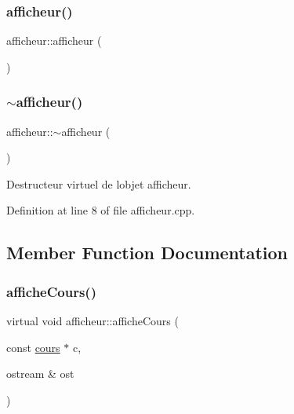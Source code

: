 \subsubsection{\texorpdfstring{afficheur()}{afficheur()}}
{\footnotesize\ttfamily afficheur\+::afficheur (\begin{DoxyParamCaption}{ }\end{DoxyParamCaption})\hspace{0.3cm}{\ttfamily [default]}}

\hypertarget{classafficheur_a093c44d15f6de24883abce836bfd11c9}{}\label{classafficheur_a093c44d15f6de24883abce836bfd11c9} 
\subsubsection{\texorpdfstring{$\sim$afficheur()}{~afficheur()}}
{\footnotesize\ttfamily afficheur\+::$\sim$afficheur (\begin{DoxyParamCaption}{ }\end{DoxyParamCaption})\hspace{0.3cm}{\ttfamily [virtual]}}



Destructeur virtuel de l\textquotesingle{}objet afficheur. 



Definition at line 8 of file afficheur.\+cpp.



\subsection{Member Function Documentation}
\hypertarget{classafficheur_a9d176576ad45c2a07a8a887b853b7edb}{}\label{classafficheur_a9d176576ad45c2a07a8a887b853b7edb} 
\subsubsection{\texorpdfstring{affiche\+Cours()}{afficheCours()}}
{\footnotesize\ttfamily virtual void afficheur\+::affiche\+Cours (\begin{DoxyParamCaption}\item[{const \hyperlink{classcours}{cours} $\ast$}]{c,  }\item[{ostream \&}]{ost }\end{DoxyParamCaption})\hspace{0.3cm}{\ttfamily [pure virtual]}}



